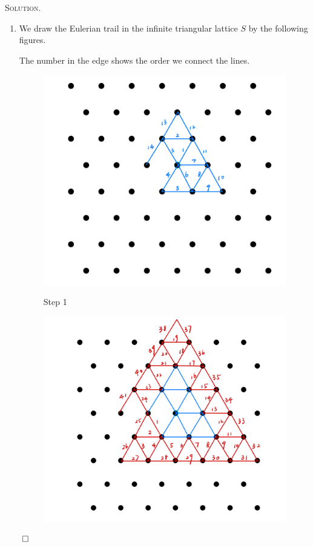 \documentclass[12pt, a4paper, oneside]{ctexart}
\newenvironment{solution}{%
	\par\noindent\textsc{Solution. }\ignorespaces
}{%
	\hfill$\qed$\par
}
\begin{document}
	\begin{solution}
		\begin{enumerate}
			\item We draw the Eulerian trail in the infinite triangular lattice $S$ by the following figures.

		The number in the edge shows the order we connect the lines.
		\begin{figure}[h]
	
			\begin{minipage}{0.32\linewidth}
				\vspace{3pt}
				
				\centerline{\includegraphics[width=\textwidth]{figure/fig6.png}}
			
				\centerline{Step 1}
			\end{minipage}
			\begin{minipage}{0.32\linewidth}
				\vspace{3pt}
				\centerline{\includegraphics[width=\textwidth]{figure/fig7.png}}
			 

\end{minipage}
\end{figure}
\end{enumerate}
\end{solution}
\end{document}
